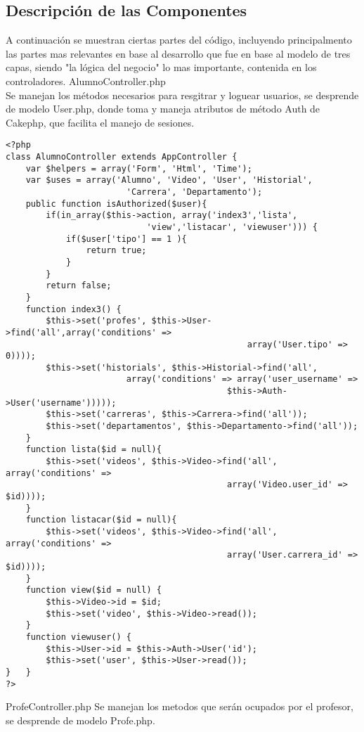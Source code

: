 \documentclass[12pt]{article}
\begin{document}
\subsection{Descripción de las Componentes}
A continuación se muestran ciertas partes del código, incluyendo principalmento las partes mas relevantes en base 
al desarrollo que fue en base al modelo de tres capas, siendo "la lógica del negocio" lo mas importante, contenida
en los controladores.
\newpage
AlumnoController.php\\
Se manejan los métodos necesarios para resgitrar y loguear usuarios, se desprende de modelo User.php, donde toma y maneja atributos de método Auth de Cakephp, que facilita el manejo de sesiones.
\footnotesize
\begin{verbatim}
<?php
class AlumnoController extends AppController {
	var $helpers = array('Form', 'Html', 'Time');
    var $uses = array('Alumno', 'Video', 'User', 'Historial', 
						'Carrera', 'Departamento');
    public function isAuthorized($user){
	    if(in_array($this->action, array('index3','lista', 
							'view','listacar', 'viewuser'))) {
		    if($user['tipo'] == 1 ){
				return true;
			}
		}
        return false;
    }
	function index3() {
		$this->set('profes', $this->User->find('all',array('conditions' => 
												array('User.tipo' => 0))));
		$this->set('historials', $this->Historial->find('all',
						array('conditions' => array('user_username' => 
											$this->Auth->User('username')))));
		$this->set('carreras', $this->Carrera->find('all'));
		$this->set('departamentos', $this->Departamento->find('all'));
	}
	function lista($id = null){
		$this->set('videos', $this->Video->find('all', array('conditions' => 
											array('Video.user_id' => $id))));
    }
	function listacar($id = null){
		$this->set('videos', $this->Video->find('all', array('conditions' => 
											array('User.carrera_id' => $id))));
    }
	function view($id = null) {
		$this->Video->id = $id;
		$this->set('video', $this->Video->read());
	}
	function viewuser() {
	    $this->User->id = $this->Auth->User('id');
	    $this->set('user', $this->User->read());
}	}
?>
\end{verbatim}
\newpage
ProfeController.php
Se manejan los metodos que serán ocupados por el profesor, se desprende de modelo Profe.php.
\footnotesize
\end{document}
